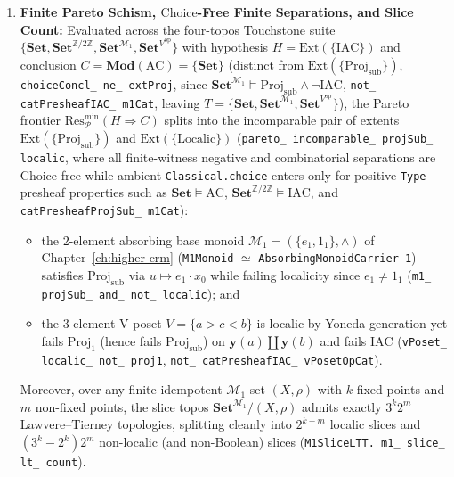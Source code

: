 \begin{proposition}
\begin{enumerate}
  \item \textbf{Finite Pareto Schism, $\mathrm{Choice}$-Free Finite Separations, and Slice Count:} Evaluated across the four-topos Touchstone suite $\{\mathbf{Set}, \mathbf{Set}^{\mathbb{Z}/2\mathbb{Z}}, \mathbf{Set}^{\mathcal{M}_1}, \mathbf{Set}^{V^{\mathrm{op}}}\}$ with hypothesis $H = \mathrm{Ext}(\{\mathrm{IAC}\})$ and conclusion $C = \mathbf{Mod}(\mathrm{AC}) = \{\mathbf{Set}\}$ (distinct from $\mathrm{Ext}(\{\mathrm{Proj}_{\mathrm{sub}}\})$, \texttt{choiceConcl\_ ne\_ extProj}, since $\mathbf{Set}^{\mathcal{M}_1} \models \mathrm{Proj}_{\mathrm{sub}} \wedge \neg\mathrm{IAC}$, \texttt{not\_ catPresheafIAC\_ m1Cat}, leaving $T = \{\mathbf{Set}, \mathbf{Set}^{\mathcal{M}_1}, \mathbf{Set}^{V^{\mathrm{op}}}\}$), the Pareto frontier $\mathrm{Res}_{\mathcal{P}}^{\min}(H \Rightarrow C)$ splits into the incomparable pair of extents $\mathrm{Ext}(\{\mathrm{Proj}_{\mathrm{sub}}\})$ and $\mathrm{Ext}(\{\mathrm{Localic}\})$ (\texttt{pareto\_ incomparable\_ projSub\_ localic}, where all finite-witness negative and combinatorial separations are Choice-free while ambient \texttt{Classical.choice} enters only for positive \texttt{Type}-presheaf properties such as $\mathbf{Set} \models \mathrm{AC}$, $\mathbf{Set}^{\mathbb{Z}/2\mathbb{Z}} \models \mathrm{IAC}$, and \texttt{catPresheafProjSub\_ m1Cat}):
  \begin{itemize}
    \item the $2$-element absorbing base monoid $\mathcal{M}_1 = (\{e_1, 1_1\}, \wedge)$ of Chapter~\ref{ch:higher-crm} (\texttt{M1Monoid} $\simeq$ \texttt{AbsorbingMonoidCarrier 1}) satisfies $\mathrm{Proj}_{\mathrm{sub}}$ via $u \mapsto e_1 \cdot x_0$ while failing localicity since $e_1 \neq 1_1$ (\texttt{m1\_ projSub\_ and\_ not\_ localic}); and
    \item the $3$-element V-poset $V = \{a > c < b\}$ is localic by Yoneda generation yet fails $\mathrm{Proj}_1$ (hence fails $\mathrm{Proj}_{\mathrm{sub}}$) on $\mathbf{y}(a) \amalg \mathbf{y}(b)$ and fails $\mathrm{IAC}$ (\texttt{vPoset\_ localic\_ not\_ proj1}, \texttt{not\_ catPresheafIAC\_ vPosetOpCat}).
  \end{itemize}
  Moreover, over any finite idempotent $\mathcal{M}_1$-set $(X, \rho)$ with $k$ fixed points and $m$ non-fixed points, the slice topos $\mathbf{Set}^{\mathcal{M}_1}/(X, \rho)$ admits exactly $3^k 2^m$ Lawvere--Tierney topologies, splitting cleanly into $2^{k+m}$ localic slices and $(3^k - 2^k) 2^m$ non-localic (and non-Boolean) slices (\texttt{M1SliceLTT. m1\_ slice\_ lt\_ count}).
\end{enumerate}
\end{proposition}

